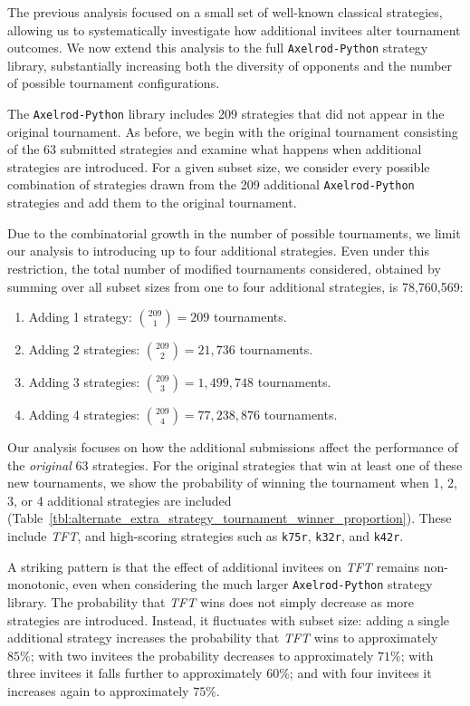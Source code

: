 \documentclass{article}
\newcommand{\TFT}{\emph{TFT}}
\newcommand{\AXL}{\texttt{Axelrod-Python}}
\begin{document}
The previous analysis focused on a small set of well-known classical strategies,
allowing us to systematically investigate how additional invitees alter
tournament outcomes. We now extend this analysis to the full \AXL{} strategy
library, substantially increasing both the diversity of opponents and the
number of possible tournament configurations.

The \AXL{} library includes 209 strategies that did not appear in the original
tournament. As before, we begin with the original tournament consisting of the
63 submitted strategies and examine what happens when additional strategies are
introduced. For a given subset size, we consider every possible combination of
strategies drawn from the 209 additional \AXL{} strategies and add them to the
original tournament.

Due to the combinatorial growth in the number of possible tournaments, we limit
our analysis to introducing up to four additional strategies. Even under this
restriction, the total number of modified tournaments considered, obtained by
summing over all subset sizes from one to four additional strategies, is
78{,}760{,}569:

\begin{enumerate}
    \item Adding 1 strategy: $\binom{209}{1}=209$ tournaments.
    \item Adding 2 strategies: $\binom{209}{2}=21{,}736$ tournaments.
    \item Adding 3 strategies: $\binom{209}{3}=1{,}499{,}748$ tournaments.
    \item Adding 4 strategies: $\binom{209}{4}=77{,}238{,}876$ tournaments.
\end{enumerate}

Our analysis focuses on how the additional submissions affect the performance of
the \emph{original} 63 strategies. For the original strategies that win at least
one of these new tournaments,
we show the probability of
winning the tournament when 1, 2, 3, or 4 additional strategies are included
(Table~\ref{tbl:alternate_extra_strategy_tournament_winner_proportion}). These
include \TFT{}, and high-scoring strategies such as \texttt{k75r},
\texttt{k32r}, and \texttt{k42r}.

A striking pattern is that the effect of additional invitees on \TFT{} remains
non-monotonic, even when considering the much larger \AXL{} strategy library.
The probability that \TFT{} wins does not simply decrease as more strategies
are introduced. Instead, it fluctuates with subset size: adding a single
additional strategy increases the probability that \TFT{} wins to
approximately \(85\%\); with two invitees the probability decreases to
approximately \(71\%\); with three invitees it falls further to approximately
\(60\%\); and with four invitees it increases again to approximately
\(75\%\).
\end{document}
